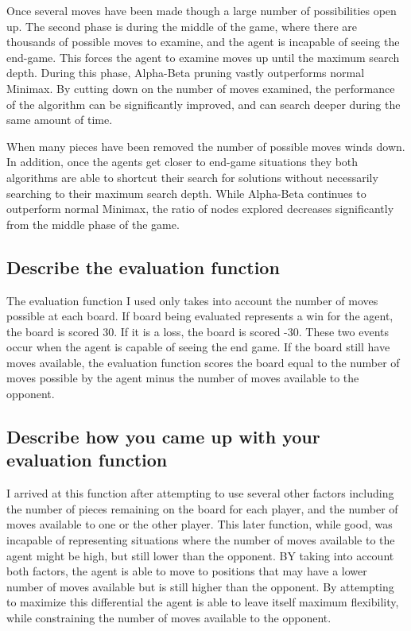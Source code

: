 \documentclass[12pt,letterpaper]{article}
\begin{document}
Once several moves have been made though a large number of possibilities open up. The second phase is during the middle of the game, where there are thousands of possible moves to examine, and the agent is incapable of seeing the end-game. This forces the agent to examine moves up until the maximum search depth. During this phase, Alpha-Beta pruning vastly outperforms normal Minimax. By cutting down on the number of moves examined, the performance of the algorithm can be significantly improved, and can search deeper during the same amount of time. 

When many pieces have been removed the number of possible moves winds down. In addition, once the agents get closer to end-game situations they both algorithms are able to shortcut their search for solutions without necessarily searching to their maximum search depth. While Alpha-Beta continues to outperform normal Minimax, the ratio of nodes explored decreases significantly from the middle phase of the game. 

\subsection{Describe the evaluation function}
The evaluation function I used only takes into account the number of moves possible at each board. If board being evaluated represents a win for the agent, the board is scored 30. If it is a loss, the board is scored -30. These two events occur when the agent is capable of seeing the end game. If the board still have moves available, the evaluation function scores the board equal to the number of moves possible by the agent minus the number of moves available to the opponent. 

\subsection{Describe how you came up with your evaluation function}
I arrived at this function after attempting to use several other factors including the number of pieces remaining on the board for each player, and the number of moves available to one or the other player. This later function, while good, was incapable of representing situations where the number of moves available to the agent might be high, but still lower than the opponent. BY taking into account both factors, the agent is able to move to positions that may have a lower number of moves available but is still higher than the opponent. By attempting to maximize this differential the agent is able to leave itself maximum flexibility, while constraining the number of moves available to the opponent. 
\end{document}
